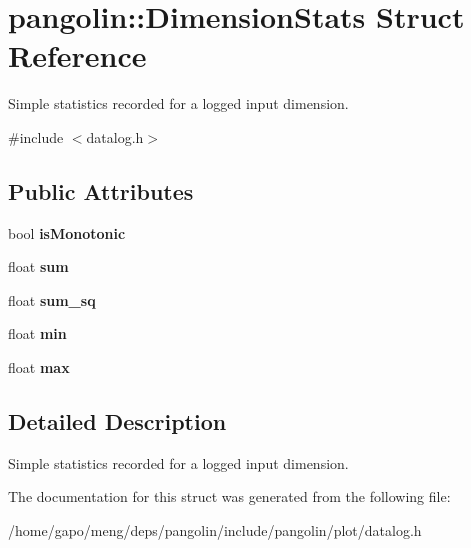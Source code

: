\hypertarget{structpangolin_1_1_dimension_stats}{}\section{pangolin\+:\+:Dimension\+Stats Struct Reference}
\label{structpangolin_1_1_dimension_stats}


Simple statistics recorded for a logged input dimension.  




{\ttfamily \#include $<$datalog.\+h$>$}

\subsection*{Public Attributes}
\begin{DoxyCompactItemize}
\item 
bool {\bfseries is\+Monotonic}\hypertarget{structpangolin_1_1_dimension_stats_a519a9658616664fc612d5046c642b2cd}{}\label{structpangolin_1_1_dimension_stats_a519a9658616664fc612d5046c642b2cd}

\item 
float {\bfseries sum}\hypertarget{structpangolin_1_1_dimension_stats_abf62d532ffe75850ddca3ab008d18534}{}\label{structpangolin_1_1_dimension_stats_abf62d532ffe75850ddca3ab008d18534}

\item 
float {\bfseries sum\+\_\+sq}\hypertarget{structpangolin_1_1_dimension_stats_a5ab51d111dffde00e24321da1ef9da27}{}\label{structpangolin_1_1_dimension_stats_a5ab51d111dffde00e24321da1ef9da27}

\item 
float {\bfseries min}\hypertarget{structpangolin_1_1_dimension_stats_a3637f70ef331232b4fabbef2b23e0841}{}\label{structpangolin_1_1_dimension_stats_a3637f70ef331232b4fabbef2b23e0841}

\item 
float {\bfseries max}\hypertarget{structpangolin_1_1_dimension_stats_af9b6b88f17e28c19ee21359009380251}{}\label{structpangolin_1_1_dimension_stats_af9b6b88f17e28c19ee21359009380251}

\end{DoxyCompactItemize}


\subsection{Detailed Description}
Simple statistics recorded for a logged input dimension. 

The documentation for this struct was generated from the following file\+:\begin{DoxyCompactItemize}
\item 
/home/gapo/meng/deps/pangolin/include/pangolin/plot/datalog.\+h\end{DoxyCompactItemize}
